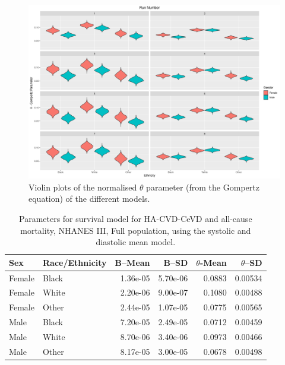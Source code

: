 \documentclass[
]{article}
\begin{document}
\begin{figure}
\hypertarget{fig:gompt}{%
\centering
\includegraphics{./Plots/gompertz/theta_parameter.png}
\caption{Violin plots of the normalised \(\theta\) parameter (from the Gompertz equation) of the different models.}\label{fig:gompt}
}
\end{figure}

\begin{table}

\caption{\label{tab:RL12}Parameters for survival model for HA-CVD-CeVD and all-cause mortality, NHANES III, Full population, using the systolic and diastolic mean model.}
\centering
\begin{tabular}[t]{llrrrr}
\toprule
Sex & Race/Ethnicity & B–Mean & B–SD & $\theta$-Mean & $\theta$–SD\\
\midrule
Female & Black & 1.36e-05 & 5.70e-06 & 0.0883 & 0.00534\\
Female & White & 2.20e-06 & 9.00e-07 & 0.1080 & 0.00488\\
Female & Other & 2.44e-05 & 1.07e-05 & 0.0775 & 0.00565\\
Male & Black & 7.20e-05 & 2.49e-05 & 0.0712 & 0.00459\\
Male & White & 8.70e-06 & 3.40e-06 & 0.0973 & 0.00466\\
\addlinespace
Male & Other & 8.17e-05 & 3.00e-05 & 0.0678 & 0.00498\\
\bottomrule
\end{tabular}
\end{table}
\end{document}
